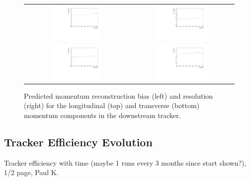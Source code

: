 \begin{figure}[ht]
	\centering
    \begin{tabular}{cc}
	    \includegraphics[width=0.5\textwidth]{downstream_p_bias_p.pdf} &	
        \includegraphics[width=0.5\textwidth]{downstream_p_resolution_p.pdf} \\
        \includegraphics[width=0.5\textwidth]{downstream_pt_bias_p.pdf} &
        \includegraphics[width=0.5\textwidth]{downstream_pt_resolution_p.pdf}
    \end{tabular}
	\caption{\label{trackers:performance:resolutions:down}Predicted momentum reconstruction bias (left) and resolution (right) for the longitudinal (top) and transverse (bottom) momentum components in the downstream tracker.}
\end{figure}


\subsection{Tracker Efficiency Evolution}

Tracker efficiency with time (maybe 1 runs every 3 months since start shown?), 1/2 page, Paul K.
